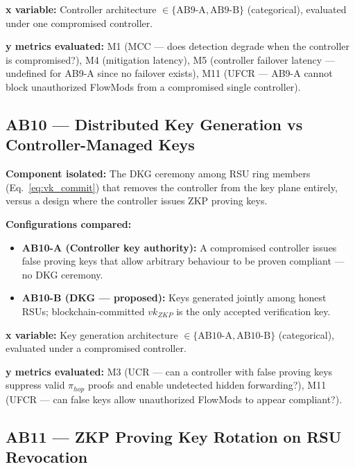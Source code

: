 \documentclass[12pt, a4paper]{report}
\begin{document}
{{\textbf{x variable:} Controller architecture
$\in \{\text{AB9-A}, \text{AB9-B}\}$ (categorical),
evaluated under one compromised controller.

\textbf{y metrics evaluated:} M1 (MCC — does detection
degrade when the controller is compromised?), M4
(mitigation latency), M5 (controller failover latency —
undefined for AB9-A since no failover exists), M11
(UFCR — AB9-A cannot block unauthorized FlowMods from
a compromised single controller).


\subsection{AB10 — Distributed Key Generation vs
Controller-Managed Keys}
\label{sec:ab10}

\textbf{Component isolated:}
The \ac{DKG} ceremony among \ac{RSU} ring members
(Eq.~\ref{eq:vk_commit}) that removes the controller
from the key plane entirely, versus a design where
the controller issues \ac{ZKP} proving keys.

\textbf{Configurations compared:}
\begin{itemize}
    \item \textbf{AB10-A (Controller key authority):}
    A compromised controller issues false proving keys
    that allow arbitrary behaviour to be proven
    compliant — no \ac{DKG} ceremony.
    \item \textbf{AB10-B (\ac{DKG} — proposed):}
    Keys generated jointly among honest \ac{RSU}s;
    blockchain-committed $vk_{ZKP}$ is the only
    accepted verification key.
\end{itemize}

\textbf{x variable:} Key generation architecture
$\in \{\text{AB10-A}, \text{AB10-B}\}$ (categorical),
evaluated under a compromised controller.

\textbf{y metrics evaluated:} M3 (UCR — can a
controller with false proving keys suppress valid
$\pi_{hop}$ proofs and enable undetected hidden
forwarding?), M11 (UFCR — can false keys allow
unauthorized FlowMods to appear compliant?).


\subsection{AB11 — ZKP Proving Key Rotation on
RSU Revocation}
\label{sec:ab11}

}}
\end{document}
